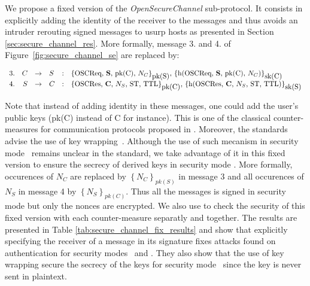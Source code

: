 We propose a fixed version of the {\em OpenSecureChannel} sub-protocol.
It consists in explicitly adding the identity of the receiver to the messages
and thus  avoids an intruder rerouting signed messages to usurp hosts as
presented in Section \ref{sec:secure_channel_res}.
More formally, message 3. and 4. of Figure~\ref{fig:secure_channel_se} are replaced
by:
\vspace{-1em}
\arraycolsep=1.4pt
\begin{flushleft}
    \[\begin{array}{lrllll}
        3. & C & \rightarrow & S & : & \text{\sm{\oscreq, {\bf S}, pk(C), $N_{C}$}{pk(S)}{sk(C)}}\\
        4. & S & \rightarrow & C & : & \text{\sm{\oscres, {\bf C}, $N_{S}$, ST, TTL}{pk(C)}{sk(S)}}\\
    \end{array}\]
\end{flushleft}
\vspace{-.5em}

Note that instead of adding identity in these messages, one could add the user's
public keys (pk(C) instead of C for instance).
This is one of the classical counter-measures for communication protocols
proposed in \cite{AN96}.
Moreover, the \opcua standards~\cite{MLD09,opcua_part2,opcua_part4,opcua_part6}
advise the use of key wrapping~\cite{FLS11}.
Although the use of such mecanism in security mode \sms~remains unclear in the
standard, we take advantage of it in this fixed version to ensure the secrecy of
derived keys in security mode \sms.
More formally, occurences of $N_{C}$ are replaced by
$\left\{\mbox{$N_{C}$}\right\}_{pk(S)}$ in message 3 and all occurences of
$N_{S}$ in message 4 by $\left\{\mbox{$N_{S}$}\right\}_{pk(C)}$.
Thus all the messages is signed in security mode \sms but only the nonces are
encrypted.
We also use \proverif to check the security of this fixed version with each
counter-measure separatly and together.
The results are presented in Table \ref{tab:secure_channel_fix_results} and show
that explicitly specifying the receiver of a message in its signature fixes
attacks found on authentication for security modes \sms~and \smse.
They also show that the use of key wrapping secure the secrecy of the keys for
security mode \sms~since the key is never sent in plaintext.

